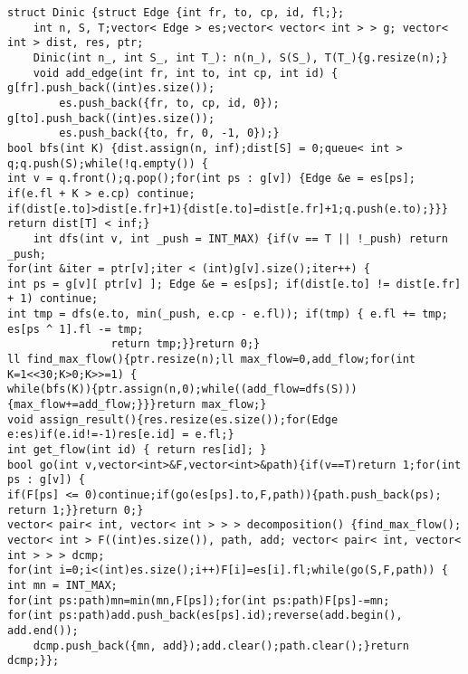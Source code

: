 \documentclass[12pt]{article}
\begin{document}
\begin{verbatim}
struct Dinic {struct Edge {int fr, to, cp, id, fl;};
    int n, S, T;vector< Edge > es;vector< vector< int > > g; vector< int > dist, res, ptr;
    Dinic(int n_, int S_, int T_): n(n_), S(S_), T(T_){g.resize(n);}
    void add_edge(int fr, int to, int cp, int id) { g[fr].push_back((int)es.size());
        es.push_back({fr, to, cp, id, 0}); g[to].push_back((int)es.size());
        es.push_back({to, fr, 0, -1, 0});}
bool bfs(int K) {dist.assign(n, inf);dist[S] = 0;queue< int > q;q.push(S);while(!q.empty()) {
int v = q.front();q.pop();for(int ps : g[v]) {Edge &e = es[ps]; if(e.fl + K > e.cp) continue;
if(dist[e.to]>dist[e.fr]+1){dist[e.to]=dist[e.fr]+1;q.push(e.to);}}} return dist[T] < inf;}
    int dfs(int v, int _push = INT_MAX) {if(v == T || !_push) return _push;
for(int &iter = ptr[v];iter < (int)g[v].size();iter++) {
int ps = g[v][ ptr[v] ]; Edge &e = es[ps]; if(dist[e.to] != dist[e.fr] + 1) continue;
int tmp = dfs(e.to, min(_push, e.cp - e.fl)); if(tmp) { e.fl += tmp; es[ps ^ 1].fl -= tmp;
                return tmp;}}return 0;}
ll find_max_flow(){ptr.resize(n);ll max_flow=0,add_flow;for(int K=1<<30;K>0;K>>=1) {
while(bfs(K)){ptr.assign(n,0);while((add_flow=dfs(S))){max_flow+=add_flow;}}}return max_flow;}
void assign_result(){res.resize(es.size());for(Edge e:es)if(e.id!=-1)res[e.id] = e.fl;}
int get_flow(int id) { return res[id]; }
bool go(int v,vector<int>&F,vector<int>&path){if(v==T)return 1;for(int ps : g[v]) {
if(F[ps] <= 0)continue;if(go(es[ps].to,F,path)){path.push_back(ps); return 1;}}return 0;}
vector< pair< int, vector< int > > > decomposition() {find_max_flow();
vector< int > F((int)es.size()), path, add; vector< pair< int, vector< int > > > dcmp;
for(int i=0;i<(int)es.size();i++)F[i]=es[i].fl;while(go(S,F,path)) { int mn = INT_MAX;
for(int ps:path)mn=min(mn,F[ps]);for(int ps:path)F[ps]-=mn;
for(int ps:path)add.push_back(es[ps].id);reverse(add.begin(), add.end());
    dcmp.push_back({mn, add});add.clear();path.clear();}return dcmp;}};
\end{verbatim}
\end{document}
